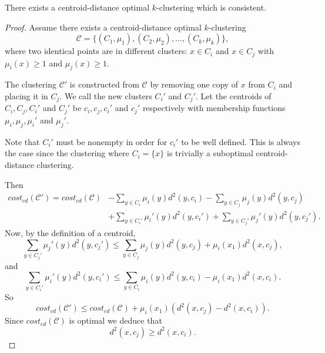 \begin{thm}
  There exists a centroid-distance optimal $k$-clustering which is consistent.
\end{thm}

\begin{proof}
  Assume there exists a centroid-distance optimal $k$-clustering
  \begin{equation*}
    \mathcal{C} = \{(C_1,\mu_1),(C_2,\mu_2),\dotsc,(C_k,\mu_k)\},
  \end{equation*}
  where two identical points are in different clusters:  $x \in C_{i}$
  and $x \in C_{j}$ with $\mu_i(x) \geq 1$ and $\mu_j(x) \geq 1$.

  The clustering $\mathcal{C}'$ is constructed from $\mathcal{C}$ by removing
  one copy of $x$ from $C_{i}$ and placing it in $C_{j}$.  We call the new
  clusters $C_{i}'$ and $C_{j}'$.  Let the centroids of $C_{i},C_{j},C_{i}'$
  and $C_{j}'$ be $c_{i},c_{j},c_{i}'$ and $c_{j}'$ respectively with
  membership functions $\mu_{i},\mu_{j},\mu_{i}'$ and $\mu_{j}'$.

  Note that $C_{i}'$ must be nonempty in order for $c_{i}'$ to be well
  defined.  This is always the case since the clustering where $C_{i} = \{x\}$
  is trivially a suboptimal centroid-distance clustering.

  Then
  \begin{align*}
    cost_{cd}(\mathcal{C}') = cost_{cd}(\mathcal{C})
    &-\sum_{y \in C_{i}} \mu_{i}(y) d^2(y,c_{i})
    -\sum_{y \in C_{j}} \mu_{j}(y) d^2(y,c_{j})\\
    &+\sum_{y \in C_{i}'} \mu_{i}'(y) d^2(y,c_{i}')
    +\sum_{y \in C_{j}'} \mu_{j}'(y) d^2(y,c_{j}').
  \end{align*}
  Now, by the definition of a centroid,
  \begin{equation*}
    \sum_{y \in C_{j}'} \mu_{j}'(y) d^2(y,c_{j}') \leq
    \sum_{y \in C_{j}} \mu_{j}(y) d^2(y,c_{j}) + \mu_{i}(x_1) d^2(x,c_{j}),
  \end{equation*}
  and
  \begin{equation*}
    \sum_{y \in C_{i}'} \mu_{i}'(y) d^2(y,c_{i}') \leq
    \sum_{y \in C_{i}} \mu_{i}(y) d^2(y,c_{i}) - \mu_{i}(x_1) d^2(x,c_{i}).
  \end{equation*}
  So
  \begin{equation*}
    cost_{cd}(\mathcal{C}') \leq cost_{cd}(\mathcal{C})
    + \mu_{i}(x_1)(d^2(x,c_{j})-d^2(x,c_{i})).
  \end{equation*}
  Since $cost_{cd}(\mathcal{C})$ is optimal we deduce that
  \begin{equation*}
    d^2(x,c_{j}) \geq d^2(x,c_{i}).
  \end{equation*}


\end{proof}
